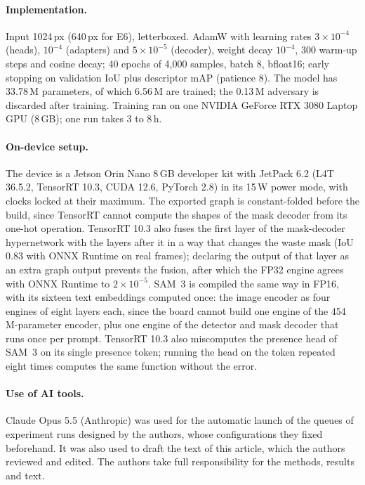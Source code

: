 \documentclass[pdflatex,sn-basic,Numbered]{sn-jnl}%
\begin{document}
\paragraph{Implementation.} Input 1024\,px (640\,px for E6), letterboxed. AdamW with learning rates $3\times10^{-4}$ (heads), $10^{-4}$ (adapters) and $5\times10^{-5}$ (decoder), weight decay $10^{-4}$, 300 warm-up steps and cosine decay; 40 epochs of 4{,}000 samples, batch 8, bfloat16; early stopping on validation IoU plus descriptor mAP (patience 8). The model has 33.78\,M parameters, of which 6.56\,M are trained; the 0.13\,M adversary is discarded after training. Training ran on one NVIDIA GeForce RTX 3080 Laptop GPU (8\,GB); one run takes 3 to 8\,h.

\paragraph{On-device setup.} The device is a Jetson Orin Nano 8\,GB developer kit with JetPack 6.2 (L4T 36.5.2, TensorRT 10.3, CUDA 12.6, PyTorch 2.8) in its 15\,W power mode, with clocks locked at their maximum. The exported graph is constant-folded before the build, since TensorRT cannot compute the shapes of the mask decoder from its one-hot operation. TensorRT 10.3 also fuses the first layer of the mask-decoder hypernetwork with the layers after it in a way that changes the waste mask (IoU 0.83 with ONNX Runtime on real frames); declaring the output of that layer as an extra graph output prevents the fusion, after which the FP32 engine agrees with ONNX Runtime to $2\times10^{-5}$. SAM~3 is compiled the same way in FP16, with its sixteen text embeddings computed once: the image encoder as four engines of eight layers each, since the board cannot build one engine of the 454\,M-parameter encoder, plus one engine of the detector and mask decoder that runs once per prompt. TensorRT 10.3 also miscomputes the presence head of SAM~3 on its single presence token; running the head on the token repeated eight times computes the same function without the error.

\paragraph{Use of AI tools.} Claude Opus 5.5 (Anthropic) was used for the automatic launch of the queues of experiment runs designed by the authors, whose configurations they fixed beforehand. It was also used to draft the text of this article, which the authors reviewed and edited. The authors take full responsibility for the methods, results and text.
\end{document}
